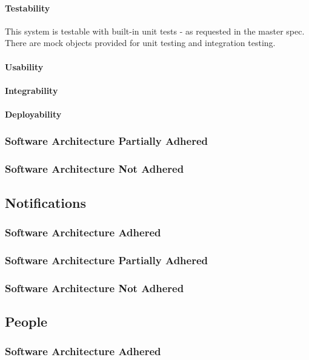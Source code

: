 \documentclass{article}
\begin{document}
            \paragraph{Testability}
            This system is testable with built-in unit tests - as requested in the master spec. There are mock objects provided for unit testing and integration testing.
            \paragraph{Usability}
            \paragraph{Integrability}
            \paragraph{Deployability}
		\subsubsection{Software Architecture Partially Adhered}
		\subsubsection{Software Architecture Not Adhered}		
		
	\subsection{Notifications}
		\subsubsection{Software Architecture Adhered}
		\subsubsection{Software Architecture Partially Adhered}
		\subsubsection{Software Architecture Not Adhered}		
		
	\subsection{People}
		\subsubsection{Software Architecture Adhered}
\end{document}
